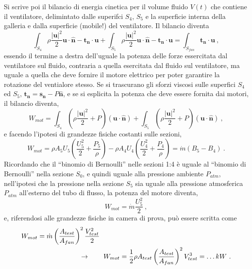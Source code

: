 Si scrive poi il bilancio di energia cinetica per il volume fluido $V(t)$ che contiene il ventilatore, delimintato dalle superifci $S_4$, $S_5$ e la superficie interna della galleria e dalla superficie (mobile!) del ventilatore. Il bilancio diventa
\begin{equation}
\int_{S_4} \rho \dfrac{|\bm{u}|^2}{2} \bm{u} \cdot \bm{\hat{n}} - \bm{t_n} \cdot \bm{u} + 
\int_{S_5} \rho \dfrac{|\bm{u}|^2}{2} \bm{u} \cdot \bm{\hat{n}} - \bm{t_n} \cdot \bm{u} = \int_{S_{fan}} \bm{t_n} \cdot \bm{u} \ ,
\end{equation}
essendo il termine a destra dell'uguale la potenza delle forze essercitata dal ventilatore sul fluido, contraria a quella esercitata dal fluido sul ventilatore, ma uguale a quella che deve fornire il motore elettrico per poter garantire la rotazione del ventialore stesso. Se si trascurano gli sforzi viscosi sulle superfici $S_4$ ed $S_5$, $\bm{t_n} = \bm{s_n} - P \bm{\hat{n}}$, e se si esplicita la potenza che deve essere fornita dai motori, il bilancio diventa,
\begin{equation}
 W_{mot} = 
\int_{S_4} \left( \rho \dfrac{|\bm{u}|^2}{2} + P \right) \left( \bm{u} \cdot \bm{\hat{n}} \right)  + 
\int_{S_5} \left( \rho \dfrac{|\bm{u}|^2}{2} + P \right) \left( \bm{u} \cdot \bm{\hat{n}} \right) \ , 
\end{equation}
e facendo l'ipotesi di grandezze fisiche costanti sulle sezioni,
\begin{equation}
 W_{mot} = \rho A_5 U_5 \left( \dfrac{U_5^2}{2} + \dfrac{P_5}{\rho} \right) 
         - \rho A_4 U_4 \left( \dfrac{U_4^2}{2} + \dfrac{P_4}{\rho} \right)
         = \dot{m} \left( B_5 - B_4 \right) \ . 
\end{equation}
Ricordando che il ``binomio di Bernoulli'' nelle sezioni 1:4 è uguale al ``binomio di Bernoulli'' nella sezione $S_0$, e quindi uguale alla pressione ambiente $P_{atm}$, nell'ipotesi che la pressione nella sezione $S_5$ sia uguale alla pressione atmosferica $P_{atm}$ all'esterno del tubo di flusso, la potenza del motore diventa,
\begin{equation}
 W_{mot} = \dot{m} \dfrac{U_5^2}{2} \ ,
\end{equation}
e, riferendosi alle grandezze fisiche in camera di prova, può essere scritta come
\begin{equation}
\begin{aligned}
 & W_{mot} = \dot{m} \left( \dfrac{A_{test}}{A_{fan}} \right)^2 \dfrac{V_{test}^2}{2} \\
 & \hspace{3.0cm} \rightarrow \qquad 
 W_{mot} = \dfrac{1}{2} \rho A_{test} \left( \dfrac{A_{test}}{A_{fan}} \right)^2 V_{test}^3 = \dots kW \ .
\end{aligned}
\end{equation}
